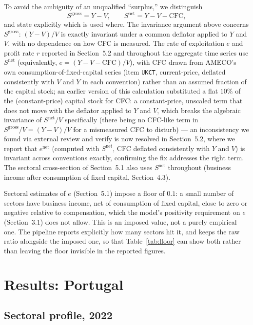 \documentclass[11pt]{article}
\begin{document}
To avoid the ambiguity of an unqualified ``surplus,'' we distinguish
\begin{equation}
  S^{\text{gross}} = Y - V, \qquad
  S^{\text{net}} = Y - V - \text{CFC},
\end{equation}
and state explicitly which is used where. The invariance argument above
concerns $S^{\text{gross}}$: $(Y-V)/V$ is exactly invariant under a
common deflator applied to $Y$ and $V$, with no dependence on how CFC is
measured. The rate of exploitation $e$ and profit rate $r$ reported in
Section~5.2 and throughout the aggregate time series use
$S^{\text{net}}$ (equivalently, $e=(Y-V-\text{CFC})/V$), with CFC drawn
from AMECO's own consumption-of-fixed-capital series (item
\texttt{UKCT}, current-price, deflated consistently with $V$ and $Y$ in
each convention) rather than an assumed fraction of the capital stock;
an earlier version of this calculation substituted a flat $10\%$ of the
(constant-price) capital stock for CFC: a constant-price, unscaled term
that does not move with the deflator applied to $Y$ and $V$, which
breaks the algebraic invariance of $S^{\text{net}}/V$ specifically
(there being no CFC-like term in $S^{\text{gross}}/V=(Y-V)/V$ for a
mismeasured CFC to disturb) --- an inconsistency we found via external
review and verify is now resolved in Section~5.2, where we report that
$e^{\text{net}}$ (computed with $S^{\text{net}}$, CFC deflated
consistently with $Y$ and $V$) is invariant across conventions exactly,
confirming the fix addresses the right term. The sectoral cross-section of Section~5.1 also uses
$S^{\text{net}}$ throughout (business income after consumption of fixed
capital, Section~4.3).

Sectoral estimates of $e$ (Section~5.1) impose a floor of $0.1$: a small
number of sectors have business income, net of consumption of fixed
capital, close to zero or negative relative to compensation, which the
model's positivity requirement on $e$ (Section~3.1) does not allow. This
is an imposed value, not a purely empirical one. The pipeline reports
explicitly how many sectors hit it, and keeps the raw ratio alongside the
imposed one, so that Table~\ref{tab:floor} can show both rather than
leaving the floor invisible in the reported figures.

\section{Results: Portugal}

\subsection{Sectoral profile, 2022}
\end{document}
